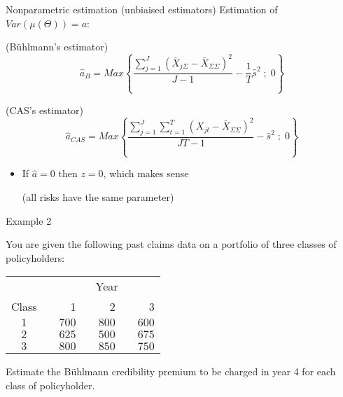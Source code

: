 \documentclass[11pt]{beamer}
\begin{document}
\begin{frame}{Nonparametric estimation (unbiaised estimators)}
Estimation of $Var(\mu(\Theta))=a$:

(B{\"u}hlmann's estimator)
\begin{equation}\hat{a}_B=Max\left\{\frac{\sum_{j=1}^J(\bar{X}_{j\Sigma}-\bar{X}_{\Sigma\Sigma})^2}{J-1}-\frac{1}{T}\hat{s}^2\;;\;0\right\}\end{equation}

(CAS's estimator)
\begin{equation}\hat{a}_{CAS}=Max\left\{\frac{\sum_{j=1}^J\sum_{t=1}^T(X_{jt}-\bar{X}_{\Sigma\Sigma})^2}{JT-1}-\hat{s}^2\;;\;0\right\}\end{equation}


\begin{itemize}
\item If $\hat{a}=0$ then $z=0$, which makes sense

(all risks have the same parameter)
\end{itemize}

\end{frame}
\begin{frame}{Example 2}

You are given the following past claims data on a portfolio of three classes of policyholders:%
\begin{center}
\begin{tabular}{ccrcrcr}
\hline
&  & \multicolumn{5}{c}{Year} \\
Class &  & 1 &  & 2 &  & 3 \\ \hline
$1$ &  & $700$ &  & $800$ &  & $600$ \\
$2$ &  & $625$ &  & $500$ &  & $675$ \\
$3$ &  & $800$ &  & $850$ &  & $750$ \\ \hline
\end{tabular}%
\end{center}%
Estimate the B\"uhlmann credibility premium to be charged in year 4
for each class of policyholder.

\end{frame}
\begin{frame}

\end{frame}
\begin{frame}

\end{frame}
\begin{frame}

\end{frame}
\end{document}
